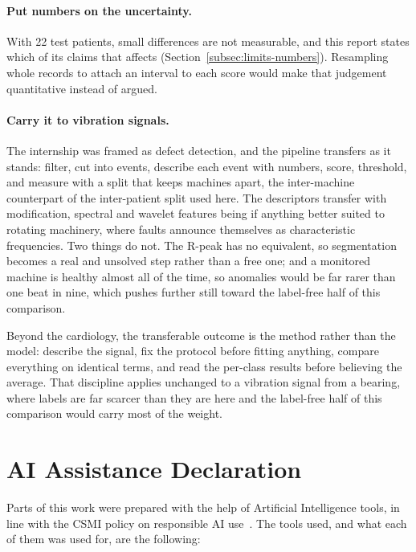 \documentclass[a4paper, 12pt]{article}
\begin{document}
\paragraph{Put numbers on the uncertainty.} With 22 test patients, small differences
are not measurable, and this report states which of its claims that affects
(Section~\ref{subsec:limits-numbers}). Resampling whole records to attach an
interval to each score would make that judgement quantitative instead of
argued.

\paragraph{Carry it to vibration signals.} The internship was framed as defect
detection, and the pipeline transfers as it stands: filter, cut into events,
describe each event with numbers, score, threshold, and measure with a split that
keeps machines apart, the inter-machine counterpart of the inter-patient split
used here. The descriptors transfer with modification, spectral and wavelet
features being if anything better suited to rotating machinery, where faults
announce themselves as characteristic frequencies. Two things do not. The R-peak
has no equivalent, so segmentation becomes a real and unsolved step rather than a
free one; and a monitored machine is healthy almost all of the time, so anomalies
would be far rarer than one beat in nine, which pushes further still toward the
label-free half of this comparison.

Beyond the cardiology, the transferable outcome is the method rather than the
model: describe the signal, fix the protocol before fitting anything, compare
everything on identical terms, and read the per-class results before believing the
average. That discipline applies unchanged to a vibration signal from a bearing,
where labels are far scarcer than they are here and the label-free half of this
comparison would carry most of the weight.


\section*{AI Assistance Declaration}

Parts of this work were prepared with the help of Artificial Intelligence tools, in
line with the CSMI policy on responsible AI use~\cite{csmitools}. The tools used,
and what each of them was used for, are the following:
\end{document}
